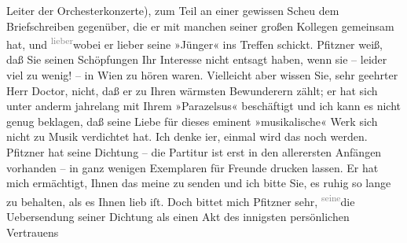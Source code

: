 \begin{ledgroupsized}[t]{13cm}
                    Leiter der Orchesterkonzerte), zum Teil an
                    einer gewissen Scheu dem Briefschreiben gegenüber, die er mit {\pb}manchen seiner großen Kollegen gemeinsam hat, und \substVorne{}\textsuperscript{\textcolor{gray}{lieber}}{\allowbreak}\substDazwischen{}wobei\substHinten{} er lieber seine »Jünger« ins Treffen schickt.\pend
           \pstart
           Pfitzner weiß, daß Sie seinen Schöpfungen Ihr
                    Interesse nicht entsagt haben, wenn sie – leider viel zu wenig! – in Wien zu hören waren. Vielleicht aber wissen Sie,
                    sehr geehrter Herr Doctor, nicht, daß er zu Ihren wärmsten Bewunderern zählt; er
                    hat sich unter anderm jahrelang mit Ihrem »Parazelsus« beschäftigt und ich kann es nicht genug beklagen, daß
                    seine Liebe für dieses eminent »musikalische« Werk sich nicht zu Musik
                    verdichtet hat. Ich denke i{\geminationm}er, einmal wird das
                    noch werden.\pend
           \pstart
           Pfitzner hat seine Dichtung – die Partitur ist erst in den
                    allerersten Anfängen vorhanden – in ganz wenigen Exemplaren für Freunde drucken
                    lassen. Er hat mich ermächtigt, Ihnen das meine zu senden und ich bitte Sie, es
                    ruhig so lange zu behalten, als es Ihnen lieb iſt. Doch bittet mich Pfitzner sehr, \substVorne{}\textsuperscript{\textcolor{gray}{seine}}\substDazwischen{}die Ueber\substHinten{}sendung seiner Dichtung als einen Akt des innigsten persönlichen Vertrauens

\end{ledgroupsized}
